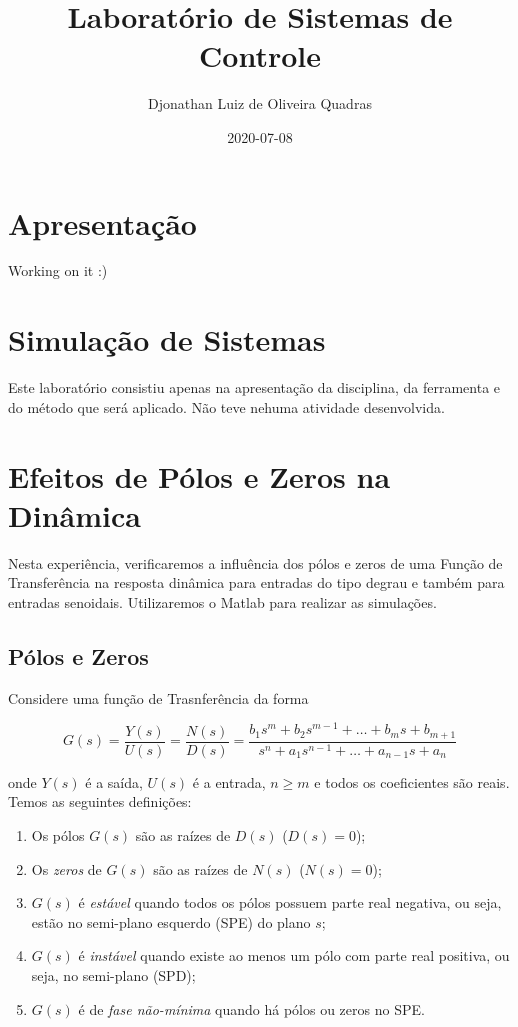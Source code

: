 \documentclass[
]{book}
\title{Laboratório de Sistemas de Controle}
\author{Djonathan Luiz de Oliveira Quadras}
\date{2020-07-08}
\providecommand{\tightlist}{%
  \setlength{\itemsep}{0pt}\setlength{\parskip}{0pt}}
\theoremstyle{definition}
\theoremstyle{definition}
\theoremstyle{definition}
\theoremstyle{remark}
\begin{document}
\maketitle

{
\setcounter{tocdepth}{1}
\tableofcontents
}
\hypertarget{apresentauxe7uxe3o}{%
\chapter*{Apresentação}\label{apresentauxe7uxe3o}}

Working on it :)

\hypertarget{simulauxe7uxe3o-de-sistemas}{%
\chapter{Simulação de Sistemas}\label{simulauxe7uxe3o-de-sistemas}}

Este laboratório consistiu apenas na apresentação da disciplina, da ferramenta e do método que será aplicado. Não teve nehuma atividade desenvolvida.

\hypertarget{lab2}{%
\chapter{Efeitos de Pólos e Zeros na Dinâmica}\label{lab2}}

Nesta experiência, verificaremos a influência dos pólos e zeros de uma Função de Transferência na resposta dinâmica para entradas do tipo degrau e também para entradas senoidais. Utilizaremos o Matlab para realizar as
simulações.

\hypertarget{puxf3los-e-zeros}{%
\section{Pólos e Zeros}\label{puxf3los-e-zeros}}

Considere uma função de Trasnferência da forma

\[
G(s) = \frac{Y(s)}{U(s)} = \frac{N(s)}{D(s)} = \frac{b_1s^m +b_2s^{m-1} + \dots + b_ms + b_{m+1}}{s^n + a_1s^{n-1}+ \dots + a_{n-1}s + a_n}
\]

onde \(Y(s)\) é a saída, \(U(s)\) é a entrada, \(n \geq m\) e todos os coeficientes são reais. Temos as seguintes definições:

\begin{enumerate}
\def\labelenumi{\arabic{enumi}.}
\tightlist
\item
  Os pólos \(G(s)\) são as raízes de \(D(s)\) (\(D(s) = 0\));
\item
  Os \emph{zeros} de \(G(s)\) são as raízes de \(N(s)\) (\(N(s) = 0\));
\item
  \(G(s)\) é \emph{estável} quando todos os pólos possuem parte real negativa, ou seja, estão no semi-plano esquerdo (SPE) do plano \(s\);
\item
  \(G(s)\) é \emph{instável} quando existe ao menos um pólo com parte real positiva, ou seja, no semi-plano (SPD);
\item
  \(G(s)\) é de \emph{fase não-mínima} quando há pólos ou zeros no SPE.
\end{enumerate}
\end{document}
